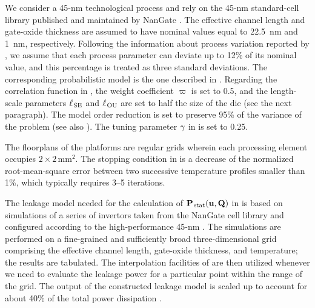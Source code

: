 We consider a 45-nm technological process and rely on the 45-nm standard-cell library published and maintained by NanGate \cite{nangate}.
The effective channel length and gate-oxide thickness are assumed to have nominal values equal to 22.5~nm and 1~nm, respectively.
Following the information about process variation reported by  \cite{itrs}, we assume that each process parameter can deviate up to 12\% of its nominal value, and this percentage is treated as three standard deviations.
The corresponding probabilistic model is the one described in .
Regarding the correlation function in , the weight coefficient $\varpi$ is set to 0.5, and the length-scale parameters $\ell_{\text{\kern0.1emSE}}$ and $\ell_{\text{\kern0.1emOU}}$ are set to half the size of the die (see the next paragraph).
The model order reduction is set to preserve 95\% of the variance of the problem (see also ).
The tuning parameter $\gamma$ in  is set to 0.25.

The floorplans of the platforms are regular grids wherein each processing element occupies $2 \times 2\,\text{mm}^2$.
The stopping condition in  is a decrease of the normalized root-mean-square error between two successive temperature profiles smaller than 1\%, which typically requires 3--5 iterations.

The leakage model needed for the calculation of $\mathbf{P}_{\text{\kern0.1emstat}}(\mathbf{u}, \mathbf{Q})$ in  is based on  simulations of a series of  invertors taken from the NanGate cell library and configured according to the high-performance 45-nm  \cite{ptm}.
The simulations are performed on a fine-grained and sufficiently broad three-dimensional grid comprising the effective channel length, gate-oxide thickness, and temperature; the results are tabulated.
The interpolation facilities of  \cite{matlab} are then utilized whenever we need to evaluate the leakage power for a particular point within the range of the grid.
The output of the constructed leakage model is scaled up to account for about 40\% of the total power dissipation \cite{liu2007}.
